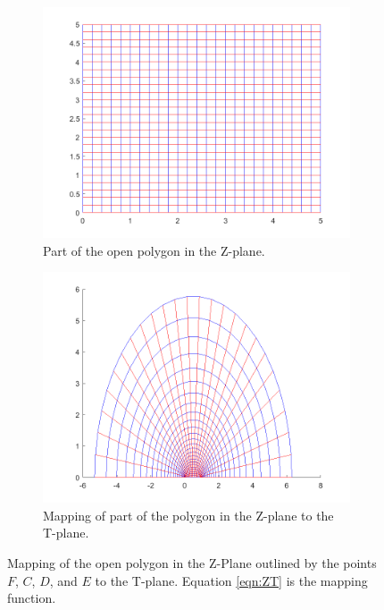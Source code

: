      \begin{figure}[h]
    \centering
    \begin{subfigure}[t]{0.45\textwidth}
        \centering
        \includegraphics[width=\textwidth]{images/ZtoT_strip.png}
        \caption{Part of the open polygon in the Z-plane.}
    \end{subfigure}
    \hfill
    \begin{subfigure}[t]{0.45\textwidth}
        \centering
        \includegraphics[width=\textwidth]{images/ZtoT_map.png}
        \caption{Mapping of part of the polygon in the Z-plane to the T-plane.}
    \end{subfigure} 
    \caption[Mapping of the open polygon in the Z-Plane to the T-plane.]{Mapping of the open polygon in the Z-Plane outlined by the points $F$, $C$, $D$, and $E$ to the T-plane. Equation \ref{eqn:ZT} is the mapping function.} 
    \label{fig:Z_to_T_mapping}
 \end{figure}

